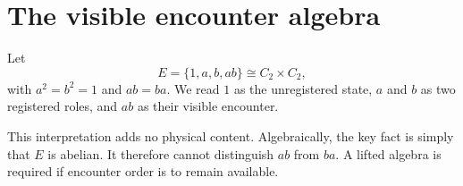 \section{The visible encounter algebra}

Let
\[
E=\{1,a,b,ab\}\cong C_2\times C_2,
\]
with \(a^2=b^2=1\) and \(ab=ba\). We read \(1\) as the unregistered
state, \(a\) and \(b\) as two registered roles, and \(ab\) as their visible
encounter.

This interpretation adds no physical content. Algebraically, the key
fact is simply that \(E\) is abelian. It therefore cannot distinguish
\(ab\) from \(ba\). A lifted algebra is required if encounter order is to remain
available.
